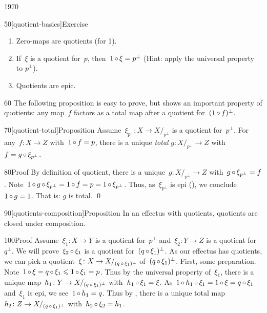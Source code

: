 \begin{parsec}{1970}
\begin{point}{50}[quotient-basics]{Exercise}
\begin{enumerate}
    \item Zero-maps are quotients (for 1).
    \item If~$\xi$ is a quotient for~$p$, then~$1\mathop{\circ} \xi = p^\perp$
                (Hint: apply the universal property to $p^\perp$).
    \item Quotients are epic.
\end{enumerate}
\begin{point}{60}%
The following proposition is easy to prove,
    but shows an important property of quotients:
    any map~$f$ factors as a total map after a quotient
    for~$(1\mathop{\circ} f)^\perp$.
\end{point}
\end{point}
\begin{point}{70}[quotient-total]{Proposition}%
Assume~$\xi_{p^\perp} \colon X \to X/_{p^\perp}$ is a quotient for~$p^\perp$.
For any~$f\colon X \to Z$
    with~$1 \mathop{\circ} f = p$,
    there is a unique \emph{total} $g\colon X/_{p^\perp} \to Z$
    with~$f = g \mathop{\circ} \xi_{p^\perp}$.
\begin{point}{80}{Proof}%
By definition of quotient, there is a unique~$g\colon X/_{p^\perp} \to Z$
    with~$g \mathop{\circ} \xi_{p^\perp} = f$.
Note~$1 \mathop{\circ} g \mathop{\circ} \xi_{p^\perp} = 1 \mathop{\circ} f = p = 1 \mathop{\circ} \xi_{p^\perp}$.
Thus, as~$\xi_{p^\perp}$ is epi (),
    we conclude~$1 \mathop{\circ} g = 1$.
That is: $g$ is total. \qed
\end{point}
\end{point}
\begin{point}{90}[quotients-composition]{Proposition}%
In an effectus with quotients,
    quotients are closed under composition.
\begin{point}{100}{Proof}%
Assume~$\xi_1\colon X \to Y$ is a quotient for~$p^\perp$
    and~$\xi_2\colon Y \to Z$ is a quotient for~$q^\perp$.
We will prove~$\xi_2 \mathop{\circ} \xi_1$
    is a quotient for~$(q \mathop{\circ} \xi_1)^\perp$.
As our effectus has quotients,
    we can pick a quotient~$\xi \colon X \to X/_{(q \mathop{\circ} \xi_1)^\perp}$
        of~$(q \mathop{\circ} \xi_1)^\perp$.
First, some preparation.
Note~$1 \mathop{\circ} \xi = q \mathop{\circ} \xi_1 \leqslant 1 \mathop{\circ} \xi_1 = p$.
Thus by the universal property of~$\xi_1$,
there is a unique map~$h_1\colon Y \to X/_{(q \mathop{\circ} \xi_1)^\perp}$
        with~$h_1 \mathop{\circ} \xi_1 = \xi$.
As~$1 \mathop{\circ} h_1 \mathop{\circ} \xi_1 = 1 \mathop{\circ} \xi = q \mathop{\circ} \xi_1$
    and~$\xi_1$ is epi, we see~$1 \mathop{\circ} h_1 = q$.
Thus by ,
there is a unique total map~$h_2 \colon Z \to X/_{(q \mathop{\circ} \xi_1)^\perp}$
    with~$h_2 \mathop{\circ} \xi_2 = h_1$.

\end{point}
\end{point}
\end{parsec}
